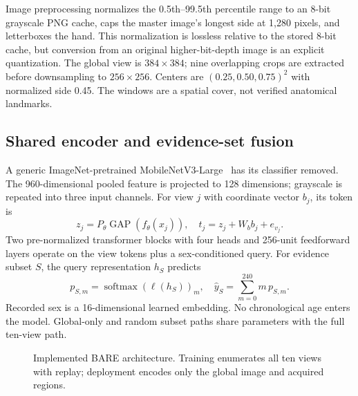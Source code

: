 \documentclass[nolineno]{ieeeaccess}
\newcommand{\softmax}{\operatorname{softmax}}
\begin{document}
Image preprocessing normalizes the 0.5th--99.5th percentile range to an 8-bit grayscale PNG cache, caps the master image's longest side at 1,280 pixels, and letterboxes the hand. This normalization is lossless relative to the stored 8-bit cache, but conversion from an original higher-bit-depth image is an explicit quantization. The global view is $384\times384$; nine overlapping crops are extracted before downsampling to $256\times256$. Centers are $(0.25,0.50,0.75)^2$ with normalized side 0.45. The windows are a spatial cover, not verified anatomical landmarks.

\subsection{Shared encoder and evidence-set fusion}
A generic ImageNet-pretrained MobileNetV3-Large~\cite{mobilenetv3} has its classifier removed. The 960-dimensional pooled feature is projected to 128 dimensions; grayscale is repeated into three input channels. For view $j$ with coordinate vector $b_j$, its token is
\begin{equation}
z_j=P_\theta\operatorname{GAP}(f_\theta(x_j)),\quad
t_j=z_j+W_b b_j+e_{v_j}.
\end{equation}
Two pre-normalized transformer blocks with four heads and 256-unit feedforward layers operate on the view tokens plus a sex-conditioned query. For evidence subset $S$, the query representation $h_S$ predicts
\begin{equation}
p_{S,m}=\softmax(\ell(h_S))_m,\quad
\hat y_S=\sum_{m=0}^{240}m\,p_{S,m}.
\end{equation}
Recorded sex is a 16-dimensional learned embedding. No chronological age enters the model. Global-only and random subset paths share parameters with the full ten-view path.

\begin{figure}[!t]\centering
{}
\caption{Implemented BARE architecture. Training enumerates all ten views with replay; deployment encodes only the global image and acquired regions.}\label{fig:architecture}\end{figure}
\end{document}
